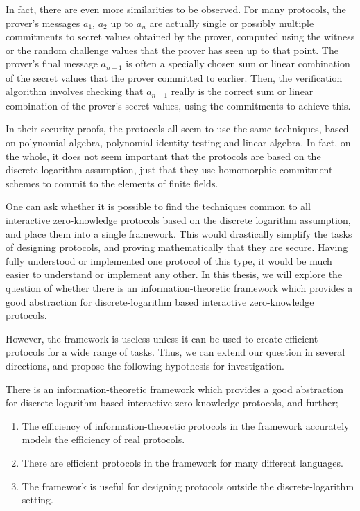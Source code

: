 In fact, there are even more similarities to be observed. For many protocols, the prover's messages $a_1$, $a_2$ up to $a_n$ are actually single or possibly multiple commitments to secret values obtained by the prover, computed using the witness or the random challenge values that the prover has seen up to that point. The prover's final message $a_{n+1}$ is often a specially chosen sum or linear combination of the secret values that the prover committed to earlier. Then, the verification algorithm involves checking that $a_{n+1}$ really is the correct sum or linear combination of the prover's secret values, using the commitments to achieve this.

In their security proofs, the protocols all seem to use the same techniques, based on polynomial algebra, polynomial identity testing and linear algebra. In fact, on the whole, it does not seem important that the protocols are based on the discrete logarithm assumption, just that they use homomorphic commitment schemes to commit to the elements of finite fields.

One can ask whether it is possible to find the techniques common to all interactive zero-knowledge protocols based on the discrete logarithm assumption, and place them into a single framework. This would drastically simplify the tasks of designing protocols, and proving mathematically that they are secure. Having fully understood or implemented one protocol of this type, it would be much easier to understand or implement any other. In this thesis, we will explore the question of whether there is an information-theoretic framework which provides a good abstraction for discrete-logarithm based interactive zero-knowledge protocols.

However, the framework is useless unless it can be used to create efficient protocols for a wide range of tasks. Thus, we can extend our question in several directions, and propose the following hypothesis for investigation.

There is an information-theoretic framework which provides a good abstraction for discrete-logarithm based interactive zero-knowledge protocols, and further;
\begin{enumerate}
\item The efficiency of information-theoretic protocols in the framework accurately models the efficiency of real protocols.
\item There are efficient protocols in the framework for many different languages.
\item The framework is useful for designing protocols outside the discrete-logarithm setting.
\end{enumerate}

